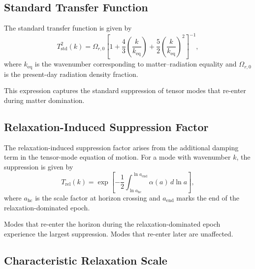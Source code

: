 \documentclass[11pt,a4paper]{article}
\begin{document}
\subsection{Standard Transfer Function}

The standard transfer function is given by
\begin{equation}
T_{\mathrm{std}}^{2}(k)
=
\Omega_{r,0}
\left[
1 + \frac{4}{3}\left( \frac{k}{k_{\mathrm{eq}}} \right)
+ \frac{5}{2}\left( \frac{k}{k_{\mathrm{eq}}} \right)^{2}
\right]^{-1},
\end{equation}
where \(k_{\mathrm{eq}}\) is the wavenumber corresponding to matter–radiation equality and
\(\Omega_{r,0}\) is the present-day radiation density fraction.

This expression captures the standard suppression of tensor modes that re-enter during matter
domination.


\subsection{Relaxation-Induced Suppression Factor}

The relaxation-induced suppression factor arises from the additional damping term in the
tensor-mode equation of motion. For a mode with wavenumber \(k\), the suppression is given by
\begin{equation}
T_{\mathrm{rel}}(k)
=
\exp\!\left[
-\frac{1}{2}
\int_{\ln a_{\mathrm{hc}}}^{\ln a_{\mathrm{end}}}
\alpha(a)\, d\ln a
\right],
\end{equation}
where \(a_{\mathrm{hc}}\) is the scale factor at horizon crossing and \(a_{\mathrm{end}}\) marks the end of the
relaxation-dominated epoch.

Modes that re-enter the horizon during the relaxation-dominated epoch experience the largest
suppression. Modes that re-enter later are unaffected.


\subsection{Characteristic Relaxation Scale}
\end{document}
